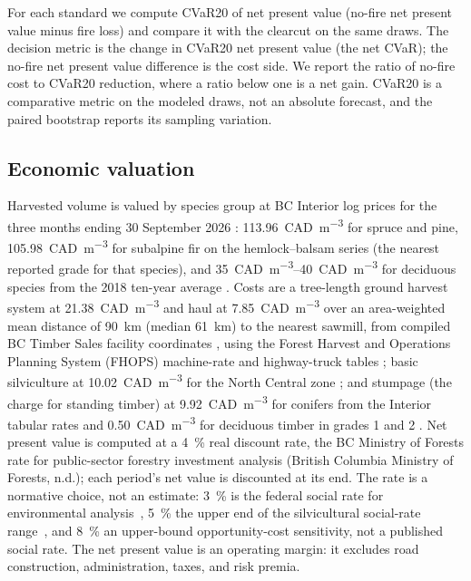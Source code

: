 For each standard we compute CVaR20 of net present value (no-fire net present value minus fire loss)
and compare it with the clearcut on the same draws. The decision metric is the change in CVaR20 net
present value (the net CVaR); the no-fire net present value difference is the cost side. We report the ratio of
no-fire cost to CVaR20 reduction, where a ratio below one is a net gain. CVaR20 is a comparative
metric on the modeled draws, not an absolute forecast, and the paired bootstrap reports its sampling
variation.

\subsection{Economic valuation}

Harvested volume is valued by species group at BC Interior log prices for the three months ending
30 September 2026 \citep{bc_mof_log_market_2026}: \SI{113.96}{CAD\per\cubic\meter} for spruce and
pine, \SI{105.98}{CAD\per\cubic\meter} for subalpine fir on the hemlock--balsam series (the nearest
reported grade for that species), and \SIrange{35}{40}{CAD\per\cubic\meter} for deciduous species
from the 2018 ten-year average \citep{ifs_aspen_2018}. Costs are a tree-length ground harvest system
at \SI{21.38}{CAD\per\cubic\meter} and haul at \SI{7.85}{CAD\per\cubic\meter} over an
area-weighted mean distance of \SI{90}{\kilo\meter} (median \SI{61}{\kilo\meter}) to the nearest
sawmill, from compiled BC Timber Sales facility coordinates
\citep{bc_timber_sales_facilities_2026}, using the Forest Harvest and Operations Planning System
(FHOPS) machine-rate and highway-truck tables \citep{fhops_2026}; basic silviculture at
\SI{10.02}{CAD\per\cubic\meter} for the North Central zone
\citep{bc_mof_silviculture_costs_2026}; and stumpage (the charge for standing timber) at
\SI{9.92}{CAD\per\cubic\meter} for conifers from the Interior tabular rates
\citep{bc_mof_tabular_stumpage_2026} and \SI{0.50}{CAD\per\cubic\meter} for deciduous timber in
grades 1 and 2 \citep{ifs_aspen_2018}. Net present value is computed at a \SI{4}{\percent} real discount rate, the BC
Ministry of Forests rate for public-sector forestry investment analysis
(British Columbia Ministry of Forests, n.d.)\nocite{bc_mof_silviculture_lesson4}; each period's
net value is discounted at its end. The rate is a
normative choice, not an estimate: \SI{3}{\percent} is the federal social rate for environmental
analysis~\citep{treasury_board_2007}, \SI{5}{\percent} the upper end of the silvicultural social-rate
range~\citep{heaps_pratt_1989}, and \SI{8}{\percent} an upper-bound opportunity-cost sensitivity, not a published social rate. The net
present value is an operating margin: it excludes road construction, administration, taxes, and risk
premia.

